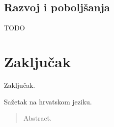 \documentclass[times, utf8, zavrsni]{fer}
\begin{document}
\section{Razvoj i poboljšanja}

TODO

\chapter{Zaključak}
Zaključak.




\begin{sazetak}
Sažetak na hrvatskom jeziku.

\end{sazetak}

\begin{abstract}
Abstract.

\end{abstract}
\end{document}
